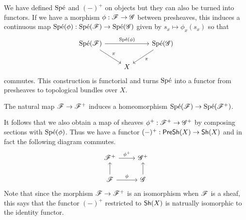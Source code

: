 \documentclass{memoir}
\begin{document}
We have defined $\text{Sp\'e}$ and $(-)^+$ on objects but they can also be turned into functors.
If we have a morphism $\phi:\mathscr{F}\to\mathscr{G}$ between presheaves, this induces a continuous map $\text{Sp\'e}(\phi):\text{Sp\'e}(\mathscr{F})\to \text{Sp\'e}(\mathscr{G})$ given by $s_x\mapsto\phi_x(s_x)$ so that 
\begin{equation}
    \begin{tikzcd}
        \Spe(\shf{F}) \arrow[rr, "\Spe(\phi)"] \arrow[rd,"\pi"] & & \Spe(\shf{G}) \arrow[dl,"\pi"] \\
                                              & X &
    \end{tikzcd}
\end{equation}
commutes.
This construction is functorial and turns $\text{Sp\'e}$ into a functor from presheaves to topological bundles over $X$.
\begin{remark}
    The natural map $\mathscr{F}\to \mathscr{F}^+$ induces a homeomorphism $\text{Sp\'e}(\mathscr{F}) \to \text{Sp\'e}(\mathscr{F}^+)$.
\end{remark}
It follows that we also obtain a map of sheaves $\phi^+:\mathscr{F}^+\to\mathscr{G}^+$ by composing sections with $\text{Sp\'e}(\phi)$.
Thus we have a functor $(-)^+:{\normalfont\mathsf{PreSh}}(X)\to{\normalfont\mathsf{Sh}}(X)$ and in fact the following diagram commutes.
\begin{equation}
    \label{eq:sheafif}
    \begin{tikzcd}
        \shf{F}^+ \arrow[r,"\phi^+"] & \shf{G}^+ \\
        \shf{F} \arrow[u] \arrow[r,"\phi"] & \shf{G} \arrow[u]
    \end{tikzcd}
\end{equation}
Note that since the morphism $\mathscr{F}\to\mathscr{F}^+$ is an isomorphism when $\mathscr{F}$ is a sheaf, this says that the functor $(-)^+$ restricted to ${\normalfont\mathsf{Sh}}(X)$ is natrually isomorphic to the identity functor.
\end{document}
